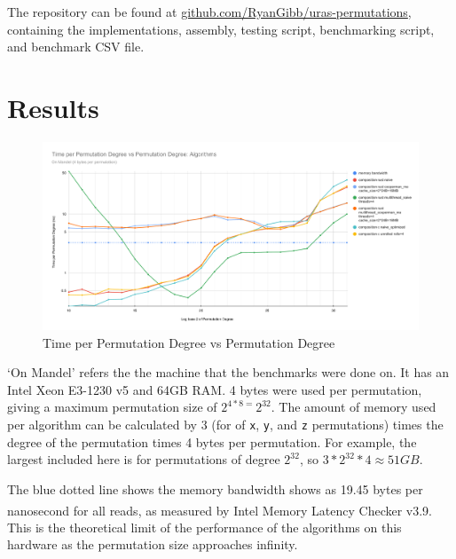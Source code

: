 \documentclass{article}
\begin{document}
The repository can be found at \href{https://github.com/RyanGibb/uras-permutations}{github.com/RyanGibb/uras-permutations}, containing the implementations, assembly, testing script, benchmarking script, and benchmark CSV file.


\clearpage
\section{Results}


\begin{figure}[h]
    \centerline{
        \includegraphics[width=0.9\paperwidth,height=\textheight,keepaspectratio]
        {Time per Permutation Degree vs Permutation Degree_ Algorithms_mandel.pdf}
    }
    \caption{Time per Permutation Degree vs Permutation Degree}
    \label{fig:1}
\end{figure}

`On Mandel' refers the the machine that the benchmarks were done on. It has an Intel Xeon E3-1230 v5 and 64GB RAM. 4 bytes were used per permutation, giving a maximum permutation size of $2^{4*8=}2^{32}$. The amount of memory used per algorithm can be calculated by 3 (for of \verb|x|, \verb|y|, and \verb|z| permutations) times the degree of the permutation times 4 bytes per permutation. For example, the largest included here is for permutations of degree $2^{32}$, so $3*2^{32}*4\approx51GB$.

The blue dotted line shows the memory bandwidth shows as 19.45 bytes per nanosecond for all reads, as measured by Intel\textsuperscript{\tiny\textregistered} Memory Latency Checker v3.9\cite{latency}. This is the theoretical limit of the performance of the algorithms on this hardware as the permutation size approaches infinity.
\end{document}
